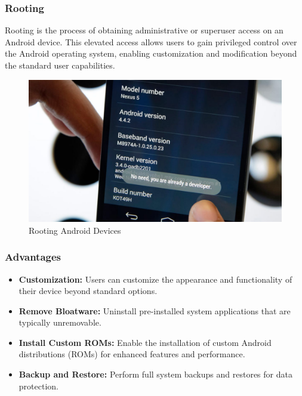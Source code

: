 \documentclass[11pt]{article}
\begin{document}
\subsubsection{Rooting}

Rooting is the process of obtaining administrative or superuser access on an
Android device. This elevated access allows users to gain privileged control
over the Android operating system, enabling customization and modification
beyond the standard user capabilities.

\begin{figure}[H]
      \centering
      \includegraphics[width=.65\textwidth]{android rooting/android rooting_2.jpg}
      \caption{Rooting Android Devices}
\end{figure}

\subsubsection*{Advantages}
\begin{itemize}
      \item \textbf{Customization:} Users can customize the appearance and functionality of their device beyond standard options.
      \item \textbf{Remove Bloatware:} Uninstall pre-installed system applications that are typically unremovable.
      \item \textbf{Install Custom ROMs:} Enable the installation of custom Android distributions (ROMs) for enhanced features and performance.
      \item \textbf{Backup and Restore:} Perform full system backups and restores for data protection.
\end{itemize}
\end{document}
